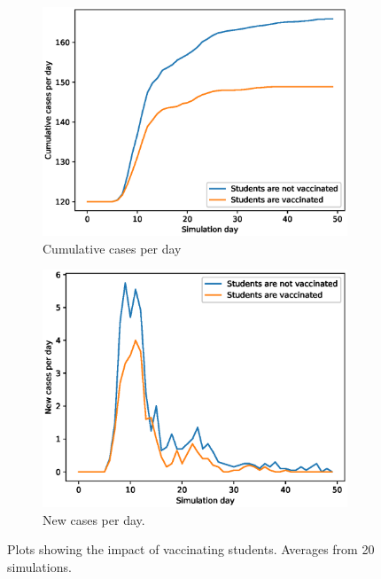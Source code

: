 \documentclass[runningheads]{llncs}
\begin{document}
\begin{figure}[h!]
	\centering
	\begin{subfigure}[b]{0.7\linewidth}
		\includegraphics[width=\textwidth]{vaccinating_cases_cum_20runs.eps}
		\caption{Cumulative cases per day} 
	\end{subfigure}
	\begin{subfigure}[b]{0.7\linewidth}
		\includegraphics[width=\textwidth]{vaccinating_cases_per_day_20runs.eps}
		\caption{New cases per day.} 
	\end{subfigure}
	\caption{Plots showing the impact of vaccinating students. Averages from 20 simulations.}
	\label{VaccinePlot}
\end{figure}
\end{document}
